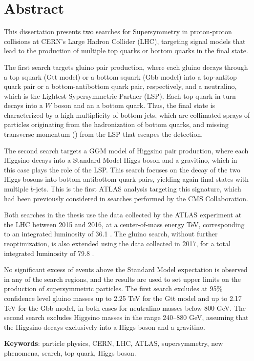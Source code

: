 \chapter*{Abstract}

This dissertation presents two searches for Supersymmetry in proton-proton collisions at CERN's Large Hadron Collider (LHC), 
targeting signal models that lead to the production of multiple top quarks or bottom quarks in the final state.

The first search targets gluino pair production, where each gluino decays through a top squark (Gtt model) or a bottom squark (Gbb model) 
into a top-antitop quark pair or a bottom-antibottom quark pair, respectively, and a neutralino, which is the Lightest Sypersymmetric Partner (LSP).
Each top quark in turn decays into a $W$ boson and an a bottom quark.
Thus, the final state is characterized by a high multiplicity of bottom jets, which are collimated sprays of particles originating from the hadronization of bottom quarks, and 
missing transverse momentum (\met) from the LSP that escapes the detection. 

The second search targets a GGM model of Higgsino pair production, 
where each Higgsino decays into a Standard Model Higgs boson and 
a gravitino, which in this case plays the role of the LSP. 
This search focuses on the decay of the two Higgs bosons into bottom-antibottom quark pairs, yielding again final states with multiple $b$-jets.
This is the first ATLAS analysis targeting this signature, which had been 
previously considered in searches performed by the CMS Collaboration.

Both searches in the thesis use the data collected by the ATLAS experiment at the LHC 
between 2015 and 2016, at a center-of-mass energy  \cmtre TeV,
corresponding to an integrated luminosity of 36.1 \ifb.
The gluino search, without further reoptimization, is also extended using the data collected in 2017, for a total integrated luminosity of 79.8 \ifb.

No significant excess of events above the Standard Model expectation is observed in any of the search regions, 
and the results are used to set upper limits on the production of supersymmetric particles. 
The first search excludes at 95\% confidence level gluino masses up to 2.25 TeV for the Gtt model 
and up to 2.17 TeV for the Gbb model, in both cases for neutralino masses below 800 GeV.
The second search excludes Higgsino masses in the range 240--880 GeV, assuming 
that the Higgsino decays exclusively into a Higgs boson and a gravitino. 

\par\bigskip
\par\bigskip 
\par\bigskip

\noindent \textbf{Keywords}: particle physics, CERN, LHC, ATLAS, supersymmetry, new phenomena, search, top quark, Higgs boson. 